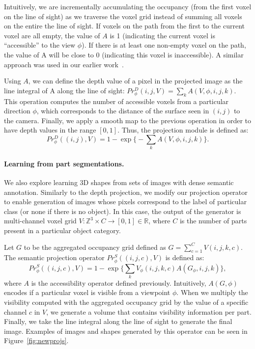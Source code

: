Intuitively, we are incrementally accumulating the occupancy (from the first voxel on the line of sight) as we traverse the voxel grid 
instead of summing all voxels on the entire the line of sight. 
If voxels on the path from the first to the current voxel are all
empty, the value of $A$ is 1 (indicating the current voxel is
``accessible'' to the view $\phi$). 
If there is at least one non-empty voxel on the path, the value of A
will be close to 0 (indicating this voxel is inaccessible).
A similar approach was used in our earlier work~\cite{deepshapeprior}.

Using $A$, we can define the depth value of a pixel in the projected image
as the line integral of A along the line of sight: $Pr^{D}_\phi(i,j, V)=\sum_{k}A(V,\phi,i,j,k)$. 
This operation computes the number of accessible voxels from a particular direction $\phi$, which
corresponds to the distance of the surface seen in $(i,j)$ to the camera.
Finally, we apply a smooth map to the previous operation in order to have depth values in the range $[0, 1]$.
Thus, the projection module is defined as:
\begin{equation}
\label{eq:expdepth}
	Pr^{D}_\phi((i,j),V) = 1 - \exp\bigg\{-\sum_{k}A(V,\phi,i,j,k)\bigg\}.
\end{equation}

\paragraph*{Learning from part segmentations.}
We also explore learning 3D shapes from sets of images with dense semantic annotation.
Similarly to the depth projection, we modify our projection operator to enable generation
of images whose pixels correspond to the label of particular class (or none if there is no object).
In this case, the output of the generator is multi-channel voxel grid 
$V:\mathbb{Z}^3 \times C \rightarrow [0,1] \in \mathbb{R}$, where $C$ is the number of parts present
in a particular object category.

Let $G$ to be the aggregated occupancy grid defined as $G=\sum_{c=1}^C V(i,j,k,c)$.
The semantic projection operator $Pr^{S}_\phi((i,j,c), V)$ is defined as:
\vspace{-10pt}
\begin{equation}
  Pr^{S}_\phi\left((i, j, c), V\right) = 1 - \exp\bigg\{\sum_k V_\phi(i,j,k,c) A(G_\phi, i, j, k)\bigg\},
\end{equation}
where $A$ is the accessibility operator defined previously.
Intuitively, $A(G, \phi)$ encodes if a particular voxel is visible from a viewpoint $\phi$.
When we multiply the visibility computed with the aggregated occupancy grid by the value of
a specific channel $c$ in $V$, we generate a volume that contains visibility information per part.
Finally, we take the line integral along the line of sight to generate the final image.
Examples of images and shapes generated by this operator can be seen in Figure~\ref{fig:newprojs}.


